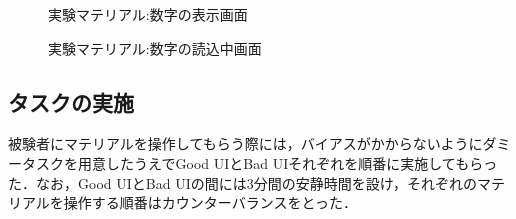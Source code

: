 \begin{figure}[htbp]
  \begin{minipage}{0.5\hsize}
    \begin{center}
    \end{center}
    \caption{実験マテリアル:数字の表示画面}
    \label{fig:old1}
  \end{minipage}
  \begin{minipage}{0.5\hsize}
    \begin{center}
    \end{center}
    \caption{実験マテリアル:数字の読込中画面}
    \label{fig:old2}
  \end{minipage}
\end{figure}

\subsection{タスクの実施}
被験者にマテリアルを操作してもらう際には，バイアスがかからないようにダミータスクを用意したうえでGood UIとBad UIそれぞれを順番に実施してもらった．なお，Good UIとBad UIの間には3分間の安静時間を設け，それぞれのマテリアルを操作する順番はカウンターバランスをとった．

